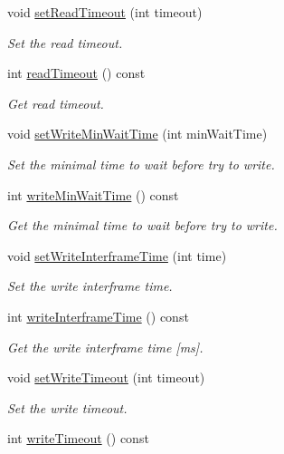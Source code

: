 \begin{DoxyCompactItemize}
void \hyperlink{classmdt_port_config_a1028f6c9d7073a6591fa59fc907f0585}{setReadTimeout} (int timeout)
\begin{DoxyCompactList}\small\item\em Set the read timeout. \end{DoxyCompactList}\item 
int \hyperlink{classmdt_port_config_ab18c2ec1628cb480a70033387e7c3333}{readTimeout} () const 
\begin{DoxyCompactList}\small\item\em Get read timeout. \end{DoxyCompactList}\item 
void \hyperlink{classmdt_port_config_a1d7515af56919b95f060cad4f83c6ef3}{setWriteMinWaitTime} (int minWaitTime)
\begin{DoxyCompactList}\small\item\em Set the minimal time to wait before try to write. \end{DoxyCompactList}\item 
int \hyperlink{classmdt_port_config_a38d6957cc1103ecf348a76fd3eb97d53}{writeMinWaitTime} () const 
\begin{DoxyCompactList}\small\item\em Get the minimal time to wait before try to write. \end{DoxyCompactList}\item 
void \hyperlink{classmdt_port_config_a7113f6d96e93978cc3915589c14b16b6}{setWriteInterframeTime} (int time)
\begin{DoxyCompactList}\small\item\em Set the write interframe time. \end{DoxyCompactList}\item 
int \hyperlink{classmdt_port_config_a745f5111436fc143b75440bf90a1a4e6}{writeInterframeTime} () const 
\begin{DoxyCompactList}\small\item\em Get the write interframe time \mbox{[}ms\mbox{]}. \end{DoxyCompactList}\item 
void \hyperlink{classmdt_port_config_ac117f7cd1f23de163a7fe84f69c2164c}{setWriteTimeout} (int timeout)
\begin{DoxyCompactList}\small\item\em Set the write timeout. \end{DoxyCompactList}\item 
int \hyperlink{classmdt_port_config_a3009e07cd66f4c4bfc1c7fdabbc9f93c}{writeTimeout} () const 

\end{DoxyCompactItemize}
